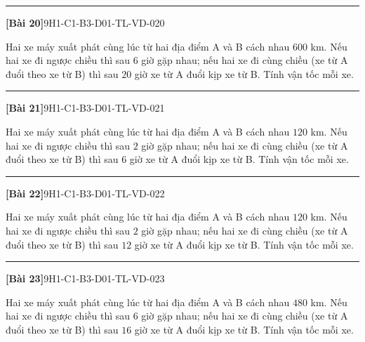\documentclass[12pt,a4paper]{article}
\newif\ifloigiai
\newenvironment{cauhoi}[2]{%
  \par\medskip\noindent\rule{\textwidth}{0.4pt}\par\nopagebreak
  \noindent\textbf{[#1]}\hfill{\scriptsize\ttfamily #2}\par\nopagebreak\smallskip}{\par}
\newcommand{\loigiai}[1]{\ifloigiai\par\smallskip\noindent\textit{Lời giải.} #1\par\fi}
\begin{document}
\begin{cauhoi}{Bài 20}{9H1-C1-B3-D01-TL-VD-020}
Hai xe máy xuất phát cùng lúc từ hai địa điểm A và B cách nhau $600$ km. Nếu hai xe đi ngược chiều thì sau $6$ giờ gặp nhau; nếu hai xe đi cùng chiều (xe từ A đuổi theo xe từ B) thì sau $20$ giờ xe từ A đuổi kịp xe từ B. Tính vận tốc mỗi xe.
\loigiai{Gọi vận tốc xe từ A là $x$ (km/h) và xe từ B là $y$ (km/h), $x>y>0$. Đi ngược chiều: $6(x+y)=600$, tức là $x+y=100$. Đi cùng chiều: $20(x-y)=600$, tức là $x-y=30$. Giải hệ ta được $x=65$, $y=35$ (thoả mãn). Vậy vận tốc xe từ A là 65 km/h, xe từ B là 35 km/h.}
\end{cauhoi}
\begin{cauhoi}{Bài 21}{9H1-C1-B3-D01-TL-VD-021}
Hai xe máy xuất phát cùng lúc từ hai địa điểm A và B cách nhau $120$ km. Nếu hai xe đi ngược chiều thì sau $2$ giờ gặp nhau; nếu hai xe đi cùng chiều (xe từ A đuổi theo xe từ B) thì sau $6$ giờ xe từ A đuổi kịp xe từ B. Tính vận tốc mỗi xe.
\loigiai{Gọi vận tốc xe từ A là $x$ (km/h) và xe từ B là $y$ (km/h), $x>y>0$. Đi ngược chiều: $2(x+y)=120$, tức là $x+y=60$. Đi cùng chiều: $6(x-y)=120$, tức là $x-y=20$. Giải hệ ta được $x=40$, $y=20$ (thoả mãn). Vậy vận tốc xe từ A là 40 km/h, xe từ B là 20 km/h.}
\end{cauhoi}
\begin{cauhoi}{Bài 22}{9H1-C1-B3-D01-TL-VD-022}
Hai xe máy xuất phát cùng lúc từ hai địa điểm A và B cách nhau $120$ km. Nếu hai xe đi ngược chiều thì sau $2$ giờ gặp nhau; nếu hai xe đi cùng chiều (xe từ A đuổi theo xe từ B) thì sau $12$ giờ xe từ A đuổi kịp xe từ B. Tính vận tốc mỗi xe.
\loigiai{Gọi vận tốc xe từ A là $x$ (km/h) và xe từ B là $y$ (km/h), $x>y>0$. Đi ngược chiều: $2(x+y)=120$, tức là $x+y=60$. Đi cùng chiều: $12(x-y)=120$, tức là $x-y=10$. Giải hệ ta được $x=35$, $y=25$ (thoả mãn). Vậy vận tốc xe từ A là 35 km/h, xe từ B là 25 km/h.}
\end{cauhoi}
\begin{cauhoi}{Bài 23}{9H1-C1-B3-D01-TL-VD-023}
Hai xe máy xuất phát cùng lúc từ hai địa điểm A và B cách nhau $480$ km. Nếu hai xe đi ngược chiều thì sau $6$ giờ gặp nhau; nếu hai xe đi cùng chiều (xe từ A đuổi theo xe từ B) thì sau $16$ giờ xe từ A đuổi kịp xe từ B. Tính vận tốc mỗi xe.
\loigiai{Gọi vận tốc xe từ A là $x$ (km/h) và xe từ B là $y$ (km/h), $x>y>0$. Đi ngược chiều: $6(x+y)=480$, tức là $x+y=80$. Đi cùng chiều: $16(x-y)=480$, tức là $x-y=30$. Giải hệ ta được $x=55$, $y=25$ (thoả mãn). Vậy vận tốc xe từ A là 55 km/h, xe từ B là 25 km/h.}
\end{cauhoi}
\end{document}
